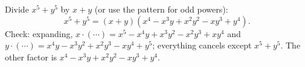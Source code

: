 Divide $x^5+y^5$ by $x+y$ (or use the pattern for odd powers):
\[
x^5+y^5=(x+y)\left(x^4-x^3y+x^2y^2-xy^3+y^4\right).
\]
Check: expanding, $x\cdot(\cdots)=x^5-x^4y+x^3y^2-x^2y^3+xy^4$ and $y\cdot(\cdots)=x^4y-x^3y^2+x^2y^3-xy^4+y^5$; everything cancels except $x^5+y^5$. The other factor is $\boxed{x^4-x^3y+x^2y^2-xy^3+y^4}$.
